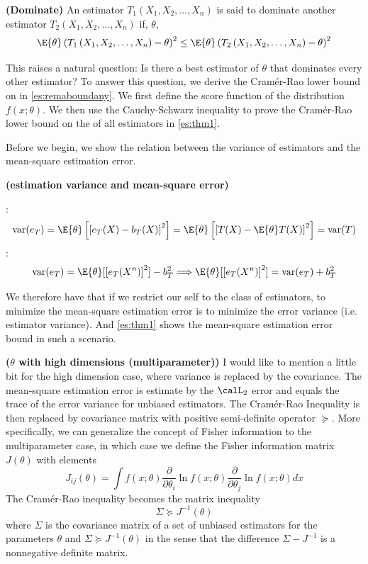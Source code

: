 \documentclass{article}
\newcommand{\bfs}[1]{\textbf{({#1})}}
\begin{document}
\begin{defa}{\bfs{Dominate}}
An estimator $T_{1}\left(X_{1}, X_{2}, \ldots, X_{n}\right)$ is said to dominate another estimator $T_{2}\left(X_{1}, X_{2}, \ldots, X_{n}\right)$ if,  $\theta$,
$$
\E{\theta}\left(T_{1}\left(X_{1}, X_{2}, \ldots, X_{n}\right)-\theta\right)^{2} \leq \E{\theta}\left(T_{2}\left(X_{1}, X_{2}, \ldots, X_{n}\right)-\theta\right)^{2}
$$
\end{defa}
This raises a natural question: Is there a best estimator of $\theta$ that dominates every other estimator? To answer this question, we derive the Cram\'{e}r-Rao lower bound on  in \cref{es:remaboundany}. We first define the score function of the distribution $f(x ; \theta) .$ We then use the Cauchy-Schwarz inequality to prove the Cramér-Rao lower bound on the  of all  estimators in \cref{es:thm1}.

Before we begin, we show the relation between the variance of estimators and the mean-square estimation error.
\begin{rema}{\bfs{estimation variance and mean-square error}}

:
$$
\operatorname{var}(e_T)=\E{\theta}\left[\left[e_T(X)-b_T(X)\right]^2\right]=\E{\theta}\left[\left[T(X)-\E{\theta}T(X)\right]^2\right] = \operatorname{var}(T)
$$
:
$$\operatorname{var}(e_T)=\E{\theta}[[e_T(X^n)]^2]-b_T^2\Longrightarrow \E{\theta}[[e_T(X^n)]^2] = \operatorname{var}(e_T)+b_T^2$$

We therefore have that if we restrict our self to the class of  estimators, to minimize the mean-square estimation error is to minimize the error variance (i.e. estimator variance). And \cref{es:thm1} shows the mean-square estimation error bound in such a scenario.
\end{rema}

\begin{rema}{\bfs{$\theta$ with high dimensions (multiparameter)}}
I would like to mention a little bit for the high dimension case, where variance is replaced by the covariance. The  mean-square estimation error is estimate by the $\calL_2$ error and equals the trace of the error variance for unbiased  estimators. The Cram\'{e}r-Rao Inequality is then replaced by covariance matrix with positive semi-definite operator $\succeq$. More specifically, we can generalize the concept of Fisher information to the multiparameter case, in which case we define the Fisher information matrix $J(\theta)$ with elements
$$
J_{i j}(\theta)=\int f(x ; \theta) \frac{\partial}{\partial \theta_{i}} \ln f(x ; \theta) \frac{\partial}{\partial \theta_{j}} \ln f(x ; \theta) d x
$$
The Cramér-Rao inequality becomes the matrix inequality
$$
\Sigma \succeq J^{-1}(\theta)
$$
where $\Sigma$ is the covariance matrix of a set of unbiased estimators for the parameters $\theta$ and $\Sigma \succeq J^{-1}(\theta)$ in the sense that the difference $\Sigma-J^{-1}$ is a nonnegative definite matrix.

\end{rema}
\end{document}
